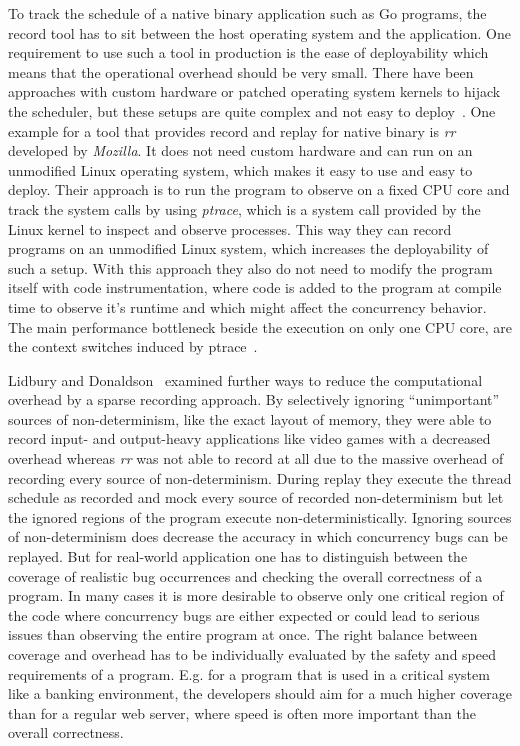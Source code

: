 \documentclass[english]{lni}
\begin{document}
To track the schedule of a native binary application such as Go programs, the record tool has to sit between the host operating system and the application.
One requirement to use such a tool in production is the ease of deployability which means that the operational overhead should be very small.
There have been approaches with custom hardware or patched operating system kernels to hijack the scheduler, but these setups are quite complex and not easy to deploy~\cite{o2017engineering}.
One example for a tool that provides record and replay for native binary is \emph{rr}~\cite{mozillarr} developed by \emph{Mozilla}.
It does not need custom hardware and can run on an unmodified Linux operating system, which makes it easy to use and easy to deploy.
Their approach is to run the program to observe on a fixed CPU core and track the system calls by using \emph{ptrace}, which is a system call provided by the Linux kernel to inspect and observe processes.
This way they can record programs on an unmodified Linux system, which increases the deployability of such a setup.
With this approach they also do not need to modify the program itself with code instrumentation, where code is added to the program at compile time to observe it's runtime and which might affect the concurrency behavior.
The main performance bottleneck beside the execution on only one CPU core, are the context switches induced by ptrace~\cite{o2017engineering}.

Lidbury and Donaldson~\cite{lidbury2019sparse} examined further ways to reduce the computational overhead by a sparse recording approach.
By selectively ignoring ``unimportant'' sources of non-determinism, like the exact layout of memory, they were able to record input- and output-heavy applications like video games with a decreased overhead whereas \emph{rr} was not able to record at all due to the massive overhead of recording every source of non-determinism.
During replay they execute the thread schedule as recorded and mock every source of recorded non-determinism but let the ignored regions of the program execute non-deterministically.
Ignoring sources of non-determinism does decrease the accuracy in which concurrency bugs can be replayed.
But for real-world application one has to distinguish between the coverage of realistic bug occurrences and checking the overall correctness of a program.
In many cases it is more desirable to observe only one critical region of the code where concurrency bugs are either expected or could lead to serious issues than observing the entire program at once.
The right balance between coverage and overhead has to be individually evaluated by the safety and speed requirements of a program.
E.g. for a program that is used in a critical system like a banking environment, the developers should aim for a much higher coverage than for a regular web server, where speed is often more important than the overall correctness.
\end{document}
